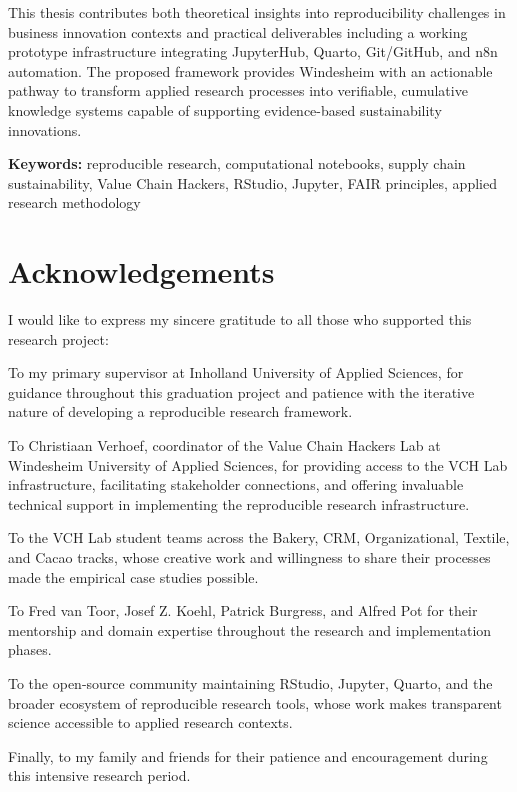 \documentclass[
  oneside,
  open=any]{scrbook}
\begin{document}
This thesis contributes both theoretical insights into reproducibility
challenges in business innovation contexts and practical deliverables
including a working prototype infrastructure integrating JupyterHub,
Quarto, Git/GitHub, and n8n automation. The proposed framework provides
Windesheim with an actionable pathway to transform applied research
processes into verifiable, cumulative knowledge systems capable of
supporting evidence-based sustainability innovations.

\textbf{Keywords:} reproducible research, computational notebooks,
supply chain sustainability, Value Chain Hackers, RStudio, Jupyter, FAIR
principles, applied research methodology

\newpage

\chapter*{Acknowledgements}\label{acknowledgements}

I would like to express my sincere gratitude to all those who supported
this research project:

To my primary supervisor at Inholland University of Applied Sciences,
for guidance throughout this graduation project and patience with the
iterative nature of developing a reproducible research framework.

To Christiaan Verhoef, coordinator of the Value Chain Hackers Lab at
Windesheim University of Applied Sciences, for providing access to the
VCH Lab infrastructure, facilitating stakeholder connections, and
offering invaluable technical support in implementing the reproducible
research infrastructure.

To the VCH Lab student teams across the Bakery, CRM, Organizational,
Textile, and Cacao tracks, whose creative work and willingness to share
their processes made the empirical case studies possible.

To Fred van Toor, Josef Z. Koehl, Patrick Burgress, and Alfred Pot for
their mentorship and domain expertise throughout the research and
implementation phases.

To the open-source community maintaining RStudio, Jupyter, Quarto, and
the broader ecosystem of reproducible research tools, whose work makes
transparent science accessible to applied research contexts.

Finally, to my family and friends for their patience and encouragement
during this intensive research period.
\end{document}

